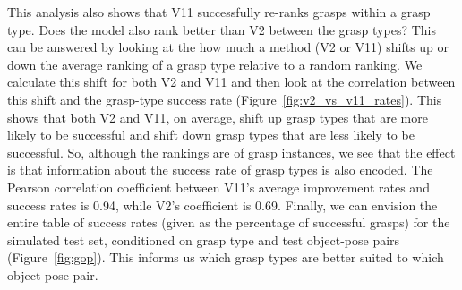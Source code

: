 This analysis also shows that V11 successfully re-ranks grasps within a grasp type. Does the model also rank better than V2 between the grasp types? This can be answered by looking at the how much a method (V2 or V11) shifts up or down the average ranking of a grasp type relative to a random ranking. We calculate this shift for both V2 and V11 and then look at the correlation between this shift and the grasp-type success rate (Figure~\ref{fig:v2_vs_v11_rates}). This shows that both V2 and V11, on average, shift up grasp types that are more likely to be successful and shift down grasp types that are less likely to be successful. So, although the rankings are of grasp instances, we see that the effect is that information about the success rate of grasp types is also encoded. The Pearson correlation coefficient between V11's average improvement rates and success rates is 0.94, while V2's coefficient is 0.69. Finally, we can envision the entire table of success rates (given as the percentage of successful grasps) for the simulated test set, conditioned on grasp type and test object-pose pairs (Figure~\ref{fig:gop}). This informs us which grasp types are better suited to which object-pose pair. 



